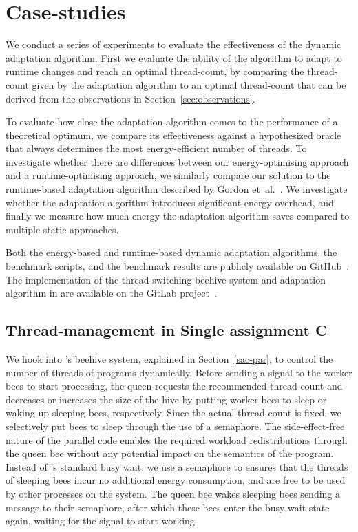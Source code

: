 
\section{Case-studies}\label{sec:evalation}

We conduct a series of experiments to evaluate the effectiveness of the dynamic adaptation algorithm.
First we evaluate the ability of the algorithm to adapt to runtime changes and reach an optimal thread-count, by comparing the thread-count given by the adaptation algorithm to an optimal thread-count that can be derived from the observations in Section~\ref{sec:observations}.

To evaluate how close the adaptation algorithm comes to the performance of a theoretical optimum, we compare its effectiveness against a hypothesized oracle that always determines the most energy-efficient number of threads.
To investigate whether there are differences between our energy-optimising approach and a runtime-optimising approach, we similarly compare our solution to the runtime-based adaptation algorithm described by Gordon et~al.~\cite{sac-mtdynamic}.
We investigate whether the adaptation algorithm introduces significant energy overhead, and finally we measure how much energy the adaptation algorithm saves compared to multiple static approaches.

Both the energy-based and runtime-based dynamic adaptation algorithms, the benchmark scripts, and the benchmark results are publicly available on GitHub~\cite{repo-mt}.
The implementation of the thread-switching beehive system and adaptation algorithm in \sac{} are available on the \sac{} GitLab project~\cite{repo-sac}.

\subsection{Thread-management in Single assignment C}\label{sec:implementation-sac}

We hook into \sac{}'s beehive system, explained in Section~\ref{sac-par}, to control the number of threads of \sac{} programs dynamically.
Before sending a signal to the worker bees to start processing, the queen requests the recommended thread-count and decreases or increases the size of the hive by putting worker bees to sleep or waking up sleeping bees, respectively.
Since the actual thread-count is fixed, we selectively put bees to sleep through the use of a semaphore.
The side-effect-free nature of the parallel code enables the required workload redistributions through the queen bee without any potential impact on the semantics of the program.
Instead of \sac{}'s standard busy wait, we use a semaphore to ensures that the threads of sleeping bees incur no additional energy consumption, and are free to be used by other processes on the system.
The queen bee wakes sleeping bees sending a message to their semaphore, after which these bees enter the busy wait state again, waiting for the signal to start working.

